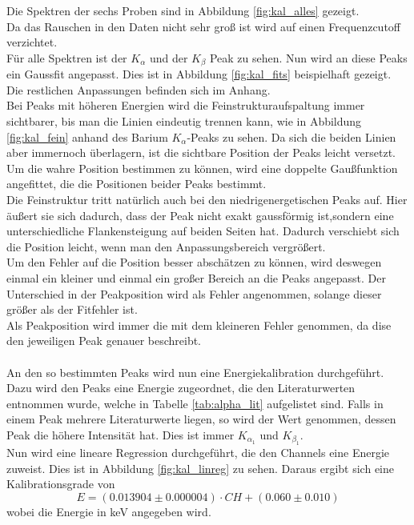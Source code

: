 \documentclass[12pt,a4paper]{article}
\begin{document}
Die Spektren der sechs Proben sind in Abbildung \ref{fig:kal_alles} gezeigt.\\
Da das Rauschen in den Daten nicht sehr groß ist wird auf einen Frequenzcutoff verzichtet.\\
Für alle Spektren ist der $K_{\alpha}$ und der $K_{\beta}$ Peak zu sehen.
Nun wird an diese Peaks ein Gaussfit angepasst. Dies ist in Abbildung \ref{fig:kal_fits} beispielhaft gezeigt. Die restlichen Anpassungen befinden sich im Anhang.\\
Bei Peaks mit höheren Energien wird die Feinstrukturaufspaltung immer sichtbarer, bis man die Linien eindeutig trennen kann, wie in Abbildung \ref{fig:kal_fein} anhand des Barium $K_{\alpha}$-Peaks zu sehen. Da sich die beiden Linien aber immernoch überlagern, ist die sichtbare Position der Peaks leicht versetzt. Um die wahre Position bestimmen zu können, wird eine doppelte Gaußfunktion angefittet, die die Positionen beider Peaks bestimmt.\\
Die Feinstruktur tritt natürlich auch bei den niedrigenergetischen Peaks auf. Hier äußert sie sich dadurch, dass der Peak nicht exakt gaussförmig ist,sondern eine unterschiedliche Flankensteigung auf beiden Seiten hat. Dadurch verschiebt sich die Position leicht, wenn man den Anpassungsbereich vergrößert.\\
Um den Fehler auf die Position besser abschätzen zu können, wird deswegen einmal ein kleiner und einmal ein großer Bereich an die Peaks angepasst. Der Unterschied in der Peakposition wird als Fehler angenommen, solange dieser größer als der Fitfehler ist.\\
Als Peakposition wird immer die mit dem kleineren Fehler genommen, da dise den jeweiligen Peak genauer beschreibt.\\
\\
An den so bestimmten Peaks wird nun eine Energiekalibration durchgeführt. Dazu wird den Peaks eine Energie zugeordnet, die den Literaturwerten entnommen wurde, welche in Tabelle \ref{tab:alpha_lit} aufgelistet sind. Falls in einem Peak mehrere Literaturwerte liegen, so wird der Wert genommen, dessen Peak die höhere Intensität hat. Dies ist immer $K_{\alpha_1}$ und $K_{\beta_{1}}$.\\
Nun wird eine lineare Regression durchgeführt, die den Channels eine Energie zuweist. Dies ist in Abbildung \ref{fig:kal_linreg} zu sehen. Daraus ergibt sich eine Kalibrationsgrade von
\begin{equation}
E = (0.013904\pm0.000004)\cdot CH + (0.060\pm0.010)
\end{equation}
wobei die Energie in keV angegeben wird.
\end{document}
